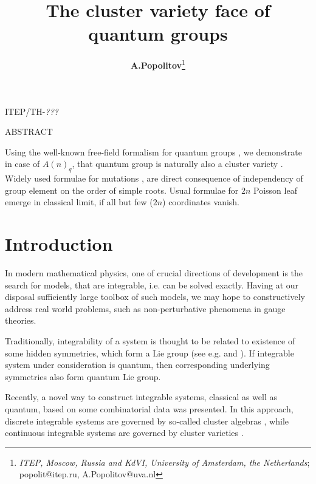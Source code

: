 \documentclass{article}
\title{{\bf The cluster variety face of quantum groups} \vspace{.2cm}}
\author{{\bf A.Popolitov}\thanks{{\small
{\it ITEP, Moscow, Russia and KdVI, University of Amsterdam, the Netherlands}}; popolit@itep.ru, A.Popolitov@uva.nl}}
\newcommand {\?}{\textit{???}}
\begin{document}
 \maketitle

\vspace{-5.0cm}

\begin{center}
\hfill ITEP/TH-\?\\
\end{center}

\vspace{3.5cm}

\centerline{ABSTRACT}

\bigskip

{\footnotesize
Using the well-known free-field formalism for quantum groups \cite{MV1}, we demonstrate
in case of $A(n)_q$, that quantum group is naturally also a cluster variety \cite{FG1}.
Widely used \cite{Hik1} formulae for mutations \cite{FG1},\cite{FG2} are
direct consequence of independency of group element on the order of simple roots.
Usual formulae \cite{Mars1} for $2 n$ Poisson leaf emerge in classical limit,
if all but few ($2n$) coordinates vanish.
}


\tableofcontents

\bigskip

\bigskip

\section{Introduction}

In modern mathematical physics, one of crucial directions of development is
the search for models, that are integrable, i.e. can be solved exactly.
Having at our disposal sufficiently large toolbox of such models, we
may hope to constructively address real world problems, such as
non-perturbative phenomena in gauge theories.

Traditionally, integrability of a system is
thought to be related to existence of some hidden symmetries, which form a Lie group
(see e.g. \cite{AASZ} and \cite{LOZ1}).
 If integrable system under consideration is quantum, then
corresponding underlying symmetries also form quantum Lie group.

Recently, a novel way to construct integrable systems, classical as well as quantum,
based on some combinatorial data was presented.
In this approach, discrete integrable systems are governed by so-called cluster algebras \cite{GShTV}, while
continuous integrable systems are governed by cluster varieties \cite{FM}.
\end{document}
